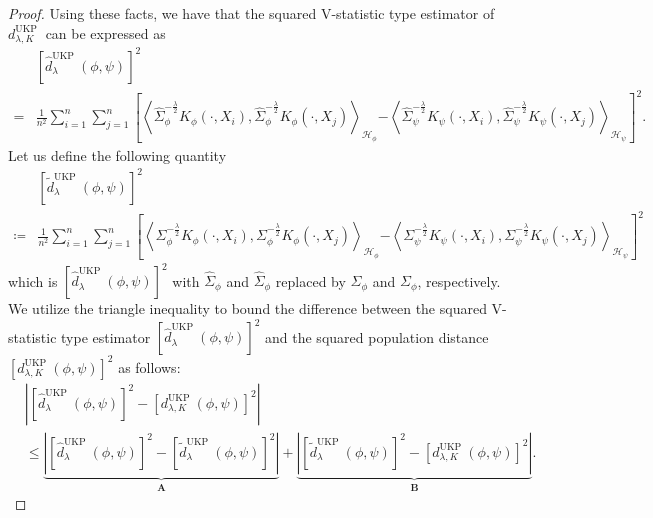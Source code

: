 \documentclass[11pt]{article}
\newcommand{\repone}{\phi}
\newcommand{\reptwo}{\psi}
\newcommand{\Hone}{\mathcal{H}_{\phi}}
\newcommand{\Htwo}{\mathcal{H}_{\psi}}
\newcommand{\inprod}[1]{\left \langle #1 \right\rangle}
\newcommand{\metricstname}{UKP }
\theoremstyle{plain}
\begin{document}
\begin{proof}
    Using these facts, we have that the squared V-statistic type estimator of $d_{\lambda,K}^{\text{\metricstname}}$ can be expressed as
    \[
    \begin{aligned}
&\left[\hat{d}_{\lambda}^{\text{\metricstname}}(\repone,\reptwo)\right]^{2}\\
        =&\frac{1}{n^{2}}\sum_{i=1}^{n}\sum_{j=1}^{n}\left[\inprod{\hat{\Sigma}_{\repone}^{-\frac{\lambda}{2}}K_{\repone}(\cdot,X_{i}),\hat{\Sigma}_{\repone}^{-\frac{\lambda}{2}}K_{\repone}(\cdot,X_{j})}_{\Hone}\right.\left.-\inprod{\hat{\Sigma}_{\reptwo}^{-\frac{\lambda}{2}}K_{\reptwo}(\cdot,X_{i}),\hat{\Sigma}_{\reptwo}^{-\frac{\lambda}{2}}K_{\reptwo}(\cdot,X_{j})}_{\Htwo}\right]^{2}.
    \end{aligned}
    \]
Let us define the following quantity
\[
\begin{aligned}
    &\left[\tilde{d}_{\lambda}^{\text{\metricstname}}(\repone,\reptwo)\right]^{2}\\
    \coloneq&\frac{1}{n^{2}}\sum_{i=1}^{n}\sum_{j=1}^{n}\left[\inprod{\Sigma_{\repone}^{-\frac{\lambda}{2}}K_{\repone}(\cdot,X_{i}),\Sigma_{\repone}^{-\frac{\lambda}{2}}K_{\repone}(\cdot,X_{j})}_{\Hone}\right.\left.-\inprod{\Sigma_{\reptwo}^{-\frac{\lambda}{2}}K_{\reptwo}(\cdot,X_{i}),\Sigma_{\reptwo}^{-\frac{\lambda}{2}}K_{\reptwo}(\cdot,X_{j})}_{\Htwo}\right]^{2} 
\end{aligned}
\]
which is $\left[\hat{d}_{\lambda}^{\text{\metricstname}}(\repone,\reptwo)\right]^{2}$ with $\hat{\Sigma}_{\repone}$ and $\hat{\Sigma}_{\repone}$ replaced by $\Sigma_{\repone}$ and $\Sigma_{\repone}$, respectively. We utilize the triangle inequality to bound the difference between the squared V-statistic type estimator $\left[\hat{d}_{\lambda}^{\text{\metricstname}}(\repone,\reptwo)\right]^{2}$ and the squared population distance $\left[d_{\lambda,K}^{\text{\metricstname}}(\repone,\reptwo)\right]^{2}$ as follows:
\begin{equation}\label{Triangle inequality for concentration result}
    \begin{aligned}
        &\left|\left[\hat{d}_{\lambda}^{\text{\metricstname}}(\repone,\reptwo)\right]^{2} - \left[d_{\lambda,K}^{\text{\metricstname}}(\repone,\reptwo)\right]^{2}\right|\\
        &\leq \underbrace{\left|\left[\hat{d}_{\lambda}^{\text{\metricstname}}(\repone,\reptwo)\right]^{2} - \left[\tilde{d}_{\lambda}^{\text{\metricstname}}(\repone,\reptwo)\right]^{2}\right|}_{\mathbf{A}} +\underbrace{\left|\left[\tilde{d}_{\lambda}^{\text{\metricstname}}(\repone,\reptwo)\right]^{2} - \left[d_{\lambda,K}^{\text{\metricstname}}(\repone,\reptwo)\right]^{2}\right|}_{\mathbf{B}}.
    \end{aligned}
\end{equation}


\end{proof}
\end{document}
